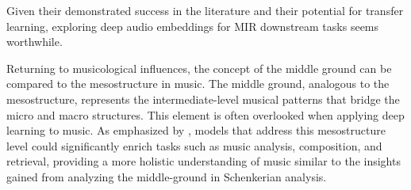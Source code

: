 Given their demonstrated success in the literature and their potential for transfer learning, exploring deep audio embeddings for MIR downstream tasks seems worthwhile.

Returning to musicological influences, the concept of the middle ground can be compared to the mesostructure in music. The middle ground, analogous to the mesostructure, represents the intermediate-level musical patterns that bridge the micro and macro structures. This element is often overlooked when applying deep learning to music. As emphasized by \cite{Mesostructures2023}, models that address this mesostructure level could significantly enrich tasks such as music analysis, composition, and retrieval, providing a more holistic understanding of music similar to the insights gained from analyzing the middle-ground in Schenkerian analysis. \cite{Introduction_to_Schenkerian_Analysis}
